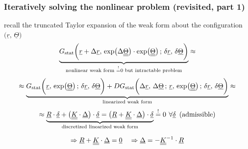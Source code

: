 \begin{frame}
  \frametitle{Iteratively solving the nonlinear problem (revisited, part 1)}

  recall the truncated Taylor expansion of the weak form about the configuration $\bigl( \underline{r}, \, \underline{\Theta} \bigr)$
  \begin{displaymath}
    \underbrace{
    G_{\text{stat}} \biggl( \underline{r} + \Delta \underline{r} , \, \exp \bigl( \Delta \underline{\underline{\Theta}} \bigr) \cdot \exp \bigl( \underline{\underline{\Theta}} \bigr) \, ; \, \delta \underline{r}, \, \delta \underline{\Theta} \biggr)
    }_{\text{nonlinear weak form } \overset{!}{=}0 \text{ but intractable problem}}
    \approx
  \end{displaymath}
  \begin{displaymath}
    \approx
    \underbrace{
    G_{\text{stat}} \biggl( \underline{r} , \, \exp \bigl( \underline{\underline{\Theta}} \bigr) \, ; \, \delta \underline{r} , \, \delta \underline{\Theta} \biggr) +
    DG_{\text{stat}} \biggl( \Delta \underline{r} , \, \Delta \underline{\Theta} \, ; \,  \underline{r} , \, \exp \bigl( \underline{\underline{\Theta}} \bigr) \, ; \, \delta \underline{r} , \, \delta \underline{\Theta} \biggr)
    }_{\text{linearized weak form}}
    \approx
  \end{displaymath}
  \begin{displaymath}
    \approx
    \underbrace{
    \underline{R} \cdot \underline{\delta} + \bigl( \underline{\underline{K}} \cdot \underline{\Delta} \bigr) \cdot \underline{\delta} =
    \bigl( \underline{R} + \underline{\underline{K}} \cdot \underline{\Delta} \bigr) \cdot \underline{\delta}
    }_{\text{discretized linearized weak form}}
    \overset{!}{=} 0 \: \, \forall \underline{\delta} \, \text{ (admissible)}
  \end{displaymath}
  
  \vspace{0.3em}
  \begin{displaymath}
    \Rightarrow \underline{R} + \underline{\underline{K}} \cdot \underline{\Delta} = \underline{0}
    \quad
    \Rightarrow \underline{\Delta} = - \underline{\underline{K}}^{-1} \cdot \underline{R}
  \end{displaymath}


\end{frame}


